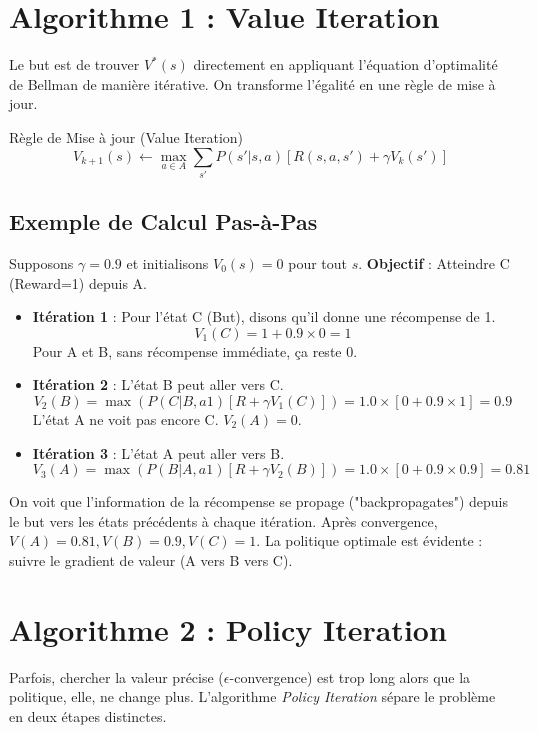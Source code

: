 \documentclass[a4paper,12pt]{report}
\begin{document}
\section{Algorithme 1 : Value Iteration}
Le but est de trouver $V^*(s)$ directement en appliquant l'équation d'optimalité de Bellman de manière itérative. On transforme l'égalité en une règle de mise à jour.

\begin{mathdef}{Règle de Mise à jour (Value Iteration)}
\[ V_{k+1}(s) \leftarrow \max_{a \in A} \sum_{s'} P(s'|s,a) [R(s,a,s') + \gamma V_k(s')] \]
\end{mathdef}

\subsection*{Exemple de Calcul Pas-à-Pas}
Supposons $\gamma=0.9$ et initialisons $V_0(s) = 0$ pour tout $s$.
\textbf{Objectif} : Atteindre C (Reward=1) depuis A.
\begin{itemize}
    \item \textbf{Itération 1} :
    Pour l'état C (But), disons qu'il donne une récompense de 1.
    \[ V_1(C) = 1 + 0.9 \times 0 = 1 \]
    Pour A et B, sans récompense immédiate, ça reste 0.
    
    \item \textbf{Itération 2} :
    L'état B peut aller vers C.
    \[ V_2(B) = \max( P(C|B, a1)[R + \gamma V_1(C)] ) = 1.0 \times [0 + 0.9 \times 1] = 0.9 \]
    L'état A ne voit pas encore C. $V_2(A) = 0$.
    
    \item \textbf{Itération 3} :
    L'état A peut aller vers B.
    \[ V_3(A) = \max( P(B|A, a1)[R + \gamma V_2(B)] ) = 1.0 \times [0 + 0.9 \times 0.9] = 0.81 \]
\end{itemize}
On voit que l'information de la récompense se propage ("backpropagates") depuis le but vers les états précédents à chaque itération.
Après convergence, $V(A)=0.81, V(B)=0.9, V(C)=1$. La politique optimale est évidente : suivre le gradient de valeur (A vers B vers C).

\section{Algorithme 2 : Policy Iteration}
Parfois, chercher la valeur précise ($\epsilon$-convergence) est trop long alors que la politique, elle, ne change plus. L'algorithme \textit{Policy Iteration} sépare le problème en deux étapes distinctes.
\end{document}
